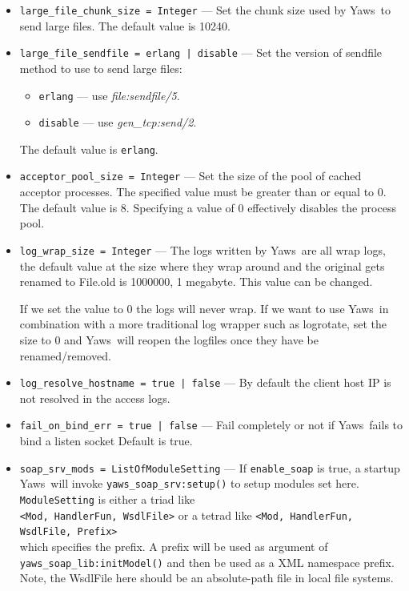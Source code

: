 \documentclass[11pt,oneside,english]{book}
\newcommand{\Yaws}            %
        {{\sc Yaws}}
\begin{document}
\begin{itemize}
\item        \verb+large_file_chunk_size = Integer+ ---
              Set the chunk size used by \Yaws\ to send large
              files. The default value is 10240.

\item        \verb+large_file_sendfile = erlang | disable+ ---
              Set the version of sendfile method to use to send large files:
              \begin{itemize}
              \item \verb+erlang+ --- use \textit{file:sendfile/5}.
              \item \verb+disable+ --- use \textit{gen\_tcp:send/2}.
              \end{itemize}
              The default value is \verb+erlang+.


\item        \verb+acceptor_pool_size = Integer+ ---
              Set the size of the pool of cached acceptor
              processes. The specified value must be greater than or
              equal to 0. The default value is 8. Specifying a value
              of 0 effectively disables the process pool.

\item        \verb+log_wrap_size = Integer+ ---
              The logs written by \Yaws\ are all wrap logs, the default value at
              the size where they wrap around and the original gets renamed to
              File.old is 1000000, 1 megabyte. This value can be changed.

              If we set the value to 0 the logs will never wrap. If we want to
              use \Yaws\ in combination with a more traditional log wrapper such
              as logrotate, set the size to 0 and \Yaws\ will reopen the
              logfiles once they have be renamed/removed.

\item        \verb+log_resolve_hostname = true | false+ ---
              By default the client host IP is not resolved in the access logs.

\item        \verb+fail_on_bind_err = true | false+ ---
              Fail completely or not if \Yaws\ fails to bind a listen socket
              Default is true.

\item        \verb+soap_srv_mods = ListOfModuleSetting+ ---
              If \verb+enable_soap+ is true, a startup \Yaws\ will invoke
              \verb+yaws_soap_srv:setup()+ to setup modules set
              here. \verb+ModuleSetting+ is either a triad like\\
              \verb+<Mod, HandlerFun, WsdlFile>+ or a tetrad like
              \verb+<Mod, HandlerFun, WsdlFile, Prefix>+\\ which specifies the
              prefix. A prefix will be used as argument of
              \verb+yaws_soap_lib:initModel()+ and then be used as a XML
              namespace prefix.  Note, the WsdlFile here should be an
              absolute-path file in local file systems.


\end{itemize}
\end{document}

